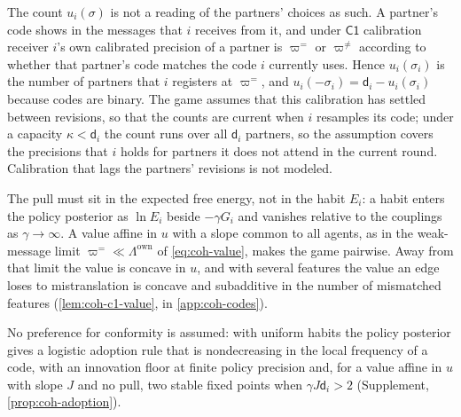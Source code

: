 The count $u_i(\sigma)$ is not a reading of the partners' choices as such. A partner's code shows in the messages that $i$ receives from it, and under $\mathsf{C1}$ calibration receiver $i$'s own calibrated precision of a partner is $\varpi^{=}$ or $\varpi^{\neq}$ according to whether that partner's code matches the code $i$ currently uses. Hence $u_i(\sigma_i)$ is the number of partners that $i$ registers at $\varpi^{=}$, and $u_i(-\sigma_i)=\mathsf d_i-u_i(\sigma_i)$ because codes are binary. The game assumes that this calibration has settled between revisions, so that the counts are current when $i$ resamples its code; under a capacity $\kappa<\mathsf d_i$ the count runs over all $\mathsf d_i$ partners, so the assumption covers the precisions that $i$ holds for partners it does not attend in the current round. Calibration that lags the partners' revisions is not modeled.

The pull must sit in the expected free energy, not in the habit $E_i$: a habit enters the policy posterior as $\ln E_i$ beside $-\gamma G_i$ and vanishes relative to the couplings as $\gamma\to\infty$. A value affine in $u$ with a slope common to all agents, as in the weak-message limit $\varpi^{=}\ll\Lambda^{\mathrm{own}}$ of \eqref{eq:coh-value}, makes the game pairwise. Away from that limit the value is concave in $u$, and with several features the value an edge loses to mistranslation is concave and subadditive in the number of mismatched features (\cref{lem:coh-c1-value}, in \cref{app:coh-codes}).

No preference for conformity is assumed: with uniform habits the policy posterior gives a logistic adoption rule that is nondecreasing in the local frequency of a code, with an innovation floor at finite policy precision and, for a value affine in $u$ with slope $J$ and no pull, two stable fixed points when $\gamma J\mathsf d_i>2$ (Supplement, \cref{prop:coh-adoption}).

